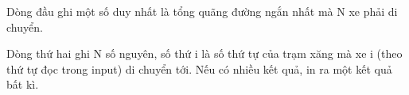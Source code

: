 Dòng đầu ghi một số duy nhất là tổng quãng đường ngắn nhất mà N xe phải di chuyển.   


   Dòng thứ hai ghi N số nguyên, số thứ i là số thứ tự của trạm xăng mà xe i (theo thứ tự đọc trong input) di chuyển tới. Nếu có nhiều kết quả, in ra một kết quả bất kì.